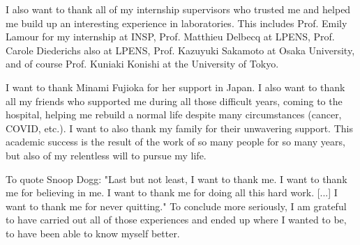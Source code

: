 \documentclass[a4paper,11pt]{article}
\renewcommand{\_}{\textunderscore\allowbreak}
\begin{document}
I also want to thank all of my internship supervisors who trusted me and helped me build up an interesting experience in laboratories. This includes Prof. Emily Lamour for my internship at INSP, Prof. Matthieu Delbecq at LPENS, Prof. Carole Diederichs also at LPENS, Prof. Kazuyuki Sakamoto at Osaka University, and of course Prof. Kuniaki Konishi at the University of Tokyo.

I want to thank Minami Fujioka for her support in Japan. I also want to thank all my friends who supported me during all those difficult years, coming to the hospital, helping me rebuild a normal life despite many circumstances (cancer, COVID, etc.). I want to also thank my family for their unwavering support. This academic success is the result of the work of so many people for so many years, but also of my relentless will to pursue my life.

To quote Snoop Dogg: "Last but not least, I want to thank me. I want to thank me for believing in me. I want to thank me for doing all this hard work. [...] I want to thank me for never quitting."
To conclude more seriously, I am grateful to have carried out all of those experiences and ended up where I wanted to be, to have been able to know myself better.

\tableofcontents

\FloatBarrier

\FloatBarrier

\FloatBarrier

\FloatBarrier

\FloatBarrier

\FloatBarrier

\FloatBarrier

\FloatBarrier

\FloatBarrier

\FloatBarrier


\FloatBarrier

\FloatBarrier
%

\FloatBarrier




%
\end{document}
